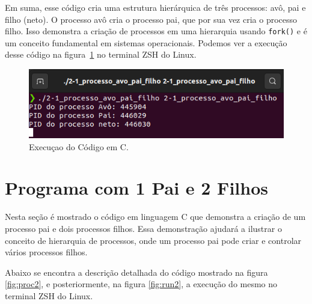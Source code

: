 \documentclass[
	12pt,				%
	openright,			%
	oneside,			%
	a4paper,			%
	chapter=TITLE,		%
	english,			%
	french,				%
	spanish,			%
	brazil				%
	]{abntex2}
\theoremstyle{definition}
\begin{document}
Em suma, esse código cria uma estrutura hierárquica de três processos: avô, 
pai e filho (neto). O processo avô cria o processo pai, 
que por sua vez cria o processo filho. Isso demonstra a 
criação de processos em uma hierarquia usando \texttt{fork()} e é 
um conceito fundamental em sistemas operacionais. Podemos ver 
a execução desse código na figura~\ref{fig:run1} no terminal ZSH do Linux.

\begin{figure}
    \centering
    \includegraphics[width=1.0\textwidth]{imagens/run_processos_1.png}
	\caption{Execuçao do Código em C. }
	\label{fig:run1}
\end{figure}

\section{Programa com 1 Pai e 2 Filhos}

Nesta seção é mostrado o código em linguagem C que demonstra a 
criação de um processo pai e dois processos filhos. Essa demonstração ajudará 
a ilustrar o conceito de hierarquia de processos, onde um processo pai pode 
criar e controlar vários processos filhos.

Abaixo se encontra a descrição detalhada do código mostrado na figura \ref{fig:proc2}, e posteriormente, 
na figura \ref{fig:run2}, a execução do mesmo no terminal ZSH do Linux.
\end{document}
